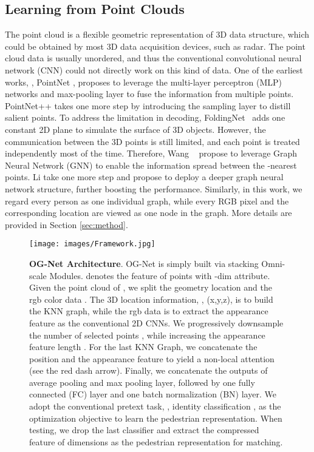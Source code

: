 \subsection{Learning from Point Clouds} 
The point cloud is a flexible geometric representation of 3D data structure, which could be obtained by most 3D data acquisition devices, such as radar. The point cloud data is usually unordered, and thus the conventional convolutional neural network (CNN) could not directly work on this kind of data. One of the earliest works, \ie, PointNet \cite{qi2017pointnet}, proposes to leverage the multi-layer perceptron (MLP) networks and max-pooling layer to fuse the information from multiple points. PointNet++ \cite{qi2017pointnet++} takes one more step by introducing the sampling layer to distill salient points. To address the limitation in decoding, FoldingNet~\cite{yang2018foldingnet} adds one constant 2D plane to simulate the surface of 3D objects. However, the communication between the 3D points is still limited, and each point is treated independently most of the time. Therefore, Wang \etal~\cite{wang2019dynamic} propose to leverage Graph Neural Network (GNN) \cite{scarselli2008graph} to enable the information spread between the -nearest points. Li \etal \cite{li2019deepgcns} take one more step and propose to deploy a deeper graph neural network structure, further boosting the performance.
Similarly, in this work, we regard every person as one individual graph, while every RGB pixel and the corresponding location are viewed as one node in the graph. More details are provided in Section \ref{sec:method}.   

\begin{figure*}[t]
\begin{center}
     \texttt{[image: images/Framework.jpg]}
\end{center} \caption{ \textbf{OG-Net Architecture}. OG-Net is simply built via stacking Omni-scale Modules.  denotes the feature of  points with -dim attribute. Given the point cloud of , we split the geometry location  and the rgb color data . The 3D location information, \ie, (x,y,z), is to build the KNN graph, while the rgb data is to extract the appearance feature as the conventional 2D CNNs. We progressively downsample the number of selected points , while increasing the appearance feature length . For the last KNN Graph, we concatenate the position  and the appearance feature  to yield a non-local attention (see the red dash arrow). Finally, we concatenate the outputs of average pooling and max pooling layer, followed by one fully connected (FC) layer and one batch normalization (BN) layer. We adopt the conventional pretext task, \ie, identity classification , as the optimization objective to learn the pedestrian representation. When testing, we drop the last classifier and extract the compressed feature of  dimensions as the pedestrian representation for matching. }
      \label{fig:Framework}
\end{figure*}

